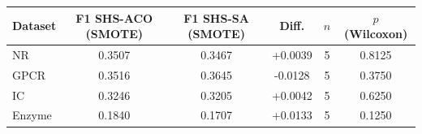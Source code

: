 \begin{tabular}{lccccc}
\toprule
Dataset & F1 SHS-ACO (SMOTE) & F1 SHS-SA (SMOTE) & Diff. & $n$ & $p$ (Wilcoxon) \\
\midrule
NR & 0.3507 & 0.3467 & +0.0039 & 5 & 0.8125 \\
GPCR & 0.3516 & 0.3645 & -0.0128 & 5 & 0.3750 \\
IC & 0.3246 & 0.3205 & +0.0042 & 5 & 0.6250 \\
Enzyme & 0.1840 & 0.1707 & +0.0133 & 5 & 0.1250 \\
\bottomrule
\end{tabular}
